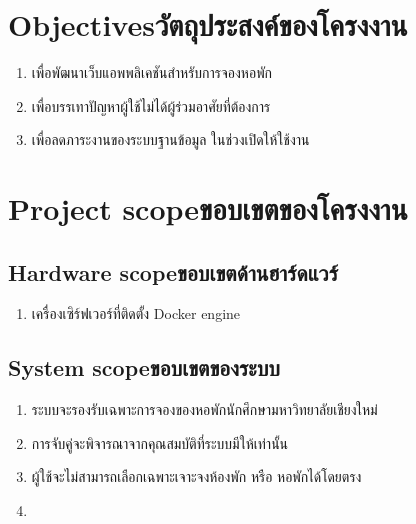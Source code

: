 
\section{\ifenglish Objectives\else วัตถุประสงค์ของโครงงาน\fi}
\begin{enumerate}
    \item เพื่อพัฒนาเว็บแอพพลิเคชันสำหรับการจองหอพัก
    \item เพื่อบรรเทาปัญหาผู้ใช้ไม่ได้ผู้ร่วมอาศัยที่ต้องการ
    \item เพื่อลดภาระงานของระบบฐานข้อมูล ในช่วงเปิดให้ใช้งาน
\end{enumerate}

\section{\ifenglish Project scope\else ขอบเขตของโครงงาน\fi}
\subsection{\ifenglish Hardware scope\else ขอบเขตด้านฮาร์ดแวร์\fi}
\begin{enumerate}
    \item เครื่องเซิร์ฟเวอร์ที่ติดตั้ง Docker engine
\end{enumerate}
\subsection{\ifenglish System scope\else ขอบเขตของระบบ\fi}
\begin{enumerate}
    \item ระบบจะรองรับเฉพาะการจองของหอพักนักศึกษามหาวิทยาลัยเชียงใหม่
    \item การจับคู่จะพิจารณาจากคุณสมบัติที่ระบบมีให้เท่านั้น
    \item ผู้ใช้จะไม่สามารถเลือกเฉพาะเจาะจงห้องพัก หรือ หอพักได้โดยตรง
    \item {}
\end{enumerate}

